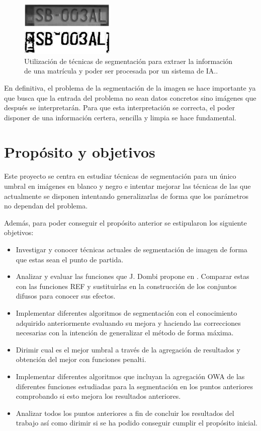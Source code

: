 \begin{figure}
\centering
	\includegraphics[width=0.4\textwidth]{img/matricula.eps}
	\caption{Utilización de técnicas de segmentación para extraer la información de una matrícula y poder ser procesada por un sistema de IA.\cite{lib:matricula}.}
	\label{img:matricula}
\end{figure}

En definitiva, el problema de la segmentación de la imagen se hace importante ya que busca que la entrada del problema no sean datos concretos sino imágenes que después se interpretarán. Para que esta interpretación se correcta, el poder disponer de una información certera, sencilla y limpia se hace fundamental.




\section{Propósito y objetivos}\label{sec:objetivos}

Este proyecto se centra en estudiar técnicas de segmentación para un único umbral en imágenes en blanco y negro e intentar mejorar las técnicas de las que actualmente se disponen intentando generalizarlas de forma que los parámetros no dependan del problema. 

Además, para poder conseguir el propósito anterior se estipularon los siguiente objetivos:
\begin{itemize}
	\item Investigar y conocer técnicas actuales de segmentación de imagen de forma que estas sean el punto de partida.
	\item Analizar y evaluar las funciones que J. Dombi propone en \cite{art:dombi}. Comparar estas con las funciones REF y sustituirlas en la construcción de los conjuntos difusos para conocer sus efectos.
	\item Implementar diferentes algoritmos de segmentación con el conocimiento adquirido anteriormente evaluando su mejora y haciendo las correcciones necesarias con la intención de generalizar el método de forma máxima.
	\item Dirimir cual es el mejor umbral a través de la agregación de resultados y obtención del mejor con funciones penalti.
	\item Implementar diferentes algoritmos que incluyan la agregación OWA de las diferentes funciones estudiadas para la segmentación en los puntos anteriores comprobando si esto mejora los resultados anteriores.
	\item Analizar todos los puntos anteriores a fin de concluir los resultados del trabajo así como dirimir si se ha podido conseguir cumplir el propósito inicial.
\end{itemize}
